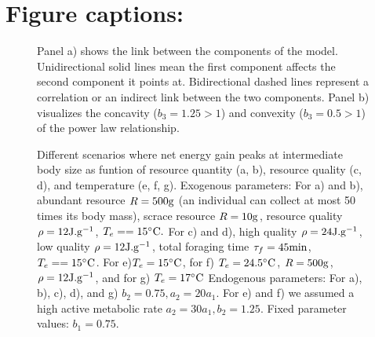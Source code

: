 \section*{Figure captions:}
\begin{figure}[H]
\begin{center}
\caption{
	Panel a) shows the link between the components of the model.
	Unidirectional solid lines mean the first component affects the second component it points at.
	Bidirectional dashed lines represent a correlation or an indirect link between the two components.
	Panel b) visualizes the concavity ($b_3  = 1.25 > 1$) and convexity ($b_3 = 0.5 > 1$) of the power law relationship.
}
\label{fig1}
\end{center}
\end{figure}
%
\begin{figure}[H]
\begin{center}
\caption{
	Different scenarios where net energy gain peaks at intermediate body size as funtion of resource quantity (a, b), resource quality (c, d), and temperature (e, f, g).
	Exogenous parameters:
	For a) and b), abundant resource $R = 500 \rm{g}$ (an individual can collect at most 50 times its body mass), scrace resource $R= 10 \rm{g}$, resource quality $\rho = 12 \rm{J.g^{-1}}$, $T_e = = 15 ^{\circ} \rm{C}.$
	For c) and d), high quality $\rho = 24 \rm{J.g^{-1}}$, low quality $\rho = 12 \rm{J.g^{-1}}$, total foraging time $\tau_f = 45 \rm{min}$, $T_e = = 15 ^{\circ} \rm{C}$.
	For e)$T_e = 15 ^{\circ} \rm{C}$, for f) $T_e = 24.5 ^{\circ} \rm{C}$, $R = 500 \rm{g}$, $\rho = 12 \rm{J.g^{-1}}$, and for g) $T_e = 17 ^{\circ} \rm{C}$
	Endogenous parameters:
	For a), b), c), d), and g) $b_2 = 0.75, a_2 = 20 a_1$.
	For e) and f) we assumed a high active metabolic rate $a_2 = 30 a_1, b_2  = 1.25$.
	Fixed parameter values: $b_1 = 0.75$.
}
\label{fig2}
\end{center}
\end{figure}
